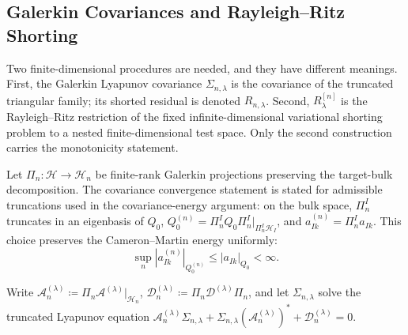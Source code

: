 \documentclass[preprint,12pt]{elsarticle}
\theoremstyle{plain}
\theoremstyle{definition}
\theoremstyle{remark}
\begin{document}
    \subsection{Galerkin Covariances and Rayleigh--Ritz Shorting}
    \label{sec:proofs:convergence}

    Two finite-dimensional procedures are needed, and they have different
    meanings.  First, the Galerkin Lyapunov covariance
    $\Sigma_{n,\lambda}$ is the covariance of the truncated triangular family;
    its shorted residual is denoted $R_{n,\lambda}$.  Second,
    $R_\lambda^{[n]}$ is the Rayleigh--Ritz restriction of the fixed
    infinite-dimensional variational shorting problem to a nested
    finite-dimensional test space.  Only the second construction carries the
    monotonicity statement.

    Let $\Pi_n: \mathcal{H} \to \mathcal{H}_n$ be finite-rank Galerkin projections preserving the target-bulk decomposition.  The covariance convergence statement is stated for admissible truncations used in the covariance-energy argument: on the bulk space, $\Pi_n^I$ truncates in an eigenbasis of $Q_0$, $Q_0^{(n)}=\Pi_n^I Q_0\Pi_n^I|_{\Pi_n^I\mathcal{H}_I}$, and $a_{Ik}^{(n)}=\Pi_n^I a_{Ik}$.  This choice preserves the Cameron--Martin energy uniformly:
    \begin{equation}
        \sup_n |a_{Ik}^{(n)}|_{Q_0^{(n)}}\le |a_{Ik}|_{Q_0}<\infty.
    \end{equation}

    Write $\mathcal{A}_n^{(\lambda)} \coloneqq \Pi_n \mathcal{A}^{(\lambda)}|_{\mathcal{H}_n}$, $\mathcal{D}_n^{(\lambda)} \coloneqq \Pi_n \mathcal{D}^{(\lambda)} \Pi_n$, and let $\Sigma_{n,\lambda}$ solve the truncated Lyapunov equation $\mathcal{A}_n^{(\lambda)} \Sigma_{n,\lambda} + \Sigma_{n,\lambda} (\mathcal{A}_n^{(\lambda)})^* + \mathcal{D}_n^{(\lambda)} = 0$.
\end{document}
